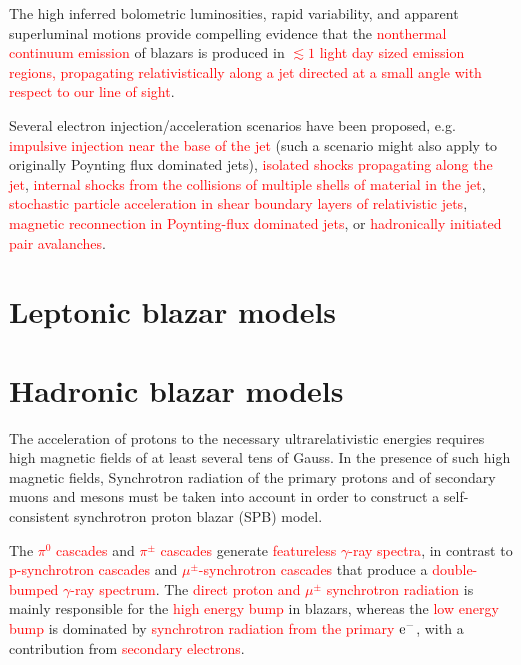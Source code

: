 \documentclass[12pt,a4paper]{article}
\begin{document}
The high inferred bolometric luminosities, rapid variability, and apparent superluminal motions provide compelling evidence that the \textcolor{red}{nonthermal continuum emission} of blazars is produced in \textcolor{red}{$\lesssim 1$ light day sized emission regions, propagating relativistically along a jet directed at a small angle with respect to our line of sight}. 

Several electron injection/acceleration scenarios have been proposed, e.g. \textcolor{red}{impulsive injection near the base of the jet} (such a scenario might also apply to originally Poynting flux dominated jets), \textcolor{red}{isolated shocks propagating along the jet}, \textcolor{red}{internal shocks from the collisions of multiple shells of material in the jet}, \textcolor{red}{stochastic particle acceleration in shear boundary layers of relativistic jets}, \textcolor{red}{magnetic reconnection in Poynting-flux dominated jets}, or \textcolor{red}{hadronically initiated pair avalanches}. 

\section{Leptonic blazar models}


\section{Hadronic blazar models}
\cite{2007Ap&SS.309...95B} The acceleration of protons to the necessary ultrarelativistic energies requires high magnetic fields of at least several tens of Gauss. In the presence of such high magnetic fields, Synchrotron radiation of the primary protons and of secondary muons and mesons must be taken into account in order to construct a self-consistent synchrotron proton blazar (SPB) model. 

The \textcolor{red}{$\pi^0$ cascades} and \textcolor{red}{$\pi^{\pm}$ cascades} generate \textcolor{red}{featureless $\gamma$-ray spectra}, in contrast to \textcolor{red}{p-synchrotron cascades} and \textcolor{red}{$\mu^{\pm}$-synchrotron cascades} that produce a \textcolor{red}{double-bumped $\gamma$-ray spectrum}. The \textcolor{red}{direct proton and $\mu^{\pm}$ synchrotron radiation} is mainly responsible for the \textcolor{red}{high energy bump} in blazars, whereas the \textcolor{red}{low energy bump} is dominated by \textcolor{red}{synchrotron radiation from the primary $\rm e^-$}, with a contribution from \textcolor{red}{secondary electrons}. 





\end{document}
